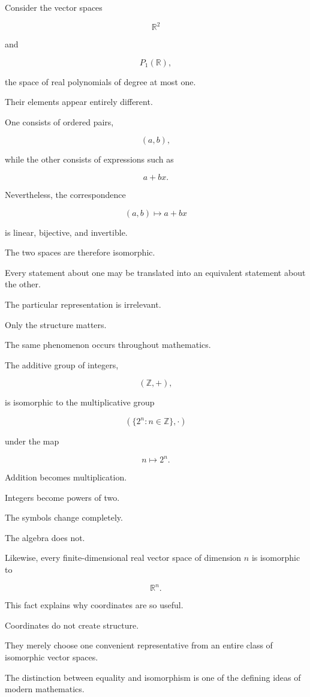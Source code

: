 \documentclass[11pt]{book}
\numberwithin{equation}{chapter}
\theoremstyle{definition}
\theoremstyle{plain}
\theoremstyle{remark}
\begin{document}
Consider the vector spaces

\[
\mathbb{R}^2
\]

and

\[
P_1(\mathbb{R}),
\]

the space of real polynomials of degree at most one.

Their elements appear entirely different.

One consists of ordered pairs,

\[
(a,b),
\]

while the other consists of expressions such as

\[
a+bx.
\]

Nevertheless, the correspondence

\[
(a,b)
\longmapsto
a+bx
\]

is linear, bijective, and invertible.

The two spaces are therefore isomorphic.

Every statement about one may be translated into an equivalent statement about the other.

The particular representation is irrelevant.

Only the structure matters.

The same phenomenon occurs throughout mathematics.

The additive group of integers,

\[
(\mathbb{Z},+),
\]

is isomorphic to the multiplicative group

\[
(\{2^n:n\in\mathbb{Z}\},\cdot)
\]

under the map

\[
n
\longmapsto
2^n.
\]

Addition becomes multiplication.

Integers become powers of two.

The symbols change completely.

The algebra does not.

Likewise, every finite-dimensional real vector space of dimension \(n\) is isomorphic to

\[
\mathbb{R}^n.
\]

This fact explains why coordinates are so useful.

Coordinates do not create structure.

They merely choose one convenient representative from an entire class of isomorphic vector spaces.

The distinction between equality and isomorphism is one of the defining ideas of modern mathematics.
\end{document}
